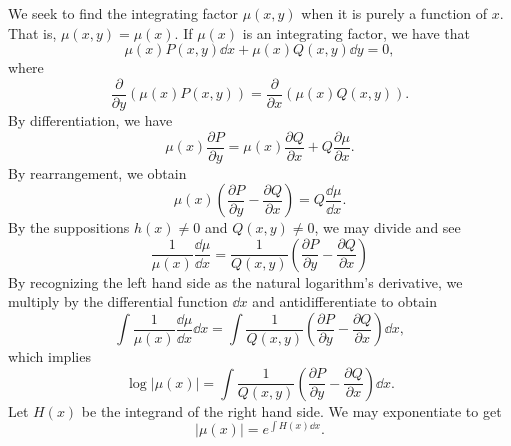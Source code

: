         \vphantom
        \\
        \\
        We seek to find the integrating factor \(\mu(x,y)\) when it is purely a function of \(x\). That is, \(\mu(x,y)=\mu(x)\). If \(\mu(x)\) is an integrating factor, we have that
        \begin{equation*}
            \mu(x)P(x,y)\dd x+\mu(x)Q(x,y)\dd y=0,
        \end{equation*}
        where 
        \begin{equation*}
            \frac{\partial}{\partial y}(\mu(x)P(x,y))=\frac{\partial}{\partial x}(\mu(x)Q(x,y)).
        \end{equation*}
        By differentiation, we have 
        \begin{equation*}
            \mu(x)\frac{\partial P}{\partial y}=\mu(x)\frac{\partial Q}{\partial x}+Q\frac{\partial \mu}{\partial x}.
        \end{equation*}
        By rearrangement, we obtain
        \begin{equation*}
            \mu(x)\left(\frac{\partial P}{\partial y}-\frac{\partial Q}{\partial x}\right)=Q\frac{\dd \mu}{\dd x}.
        \end{equation*}
        By the suppositions \(h(x)\neq0\) and \(Q(x,y)\neq0\), we may divide and see
        \begin{equation*}
            \frac{1}{\mu(x)}\frac{\dd \mu}{\dd x}=\frac{1}{Q(x,y)}\left(\frac{\partial P}{\partial y}-\frac{\partial Q}{\partial x}\right)
        \end{equation*}
        By recognizing the left hand side as the natural logarithm's derivative, we multiply by the differential function \(\dd x\) and antidifferentiate to obtain
        \begin{equation*}
            \int \frac{1}{\mu(x)}\frac{\dd \mu}{\dd x} \dd x=\int \frac{1}{Q(x,y)}\left(\frac{\partial P}{\partial y}-\frac{\partial Q}{\partial x}\right)\dd x,
        \end{equation*} 
        which implies
        \begin{equation*}
            \log|\mu(x)|=\int \frac{1}{Q(x,y)}\left(\frac{\partial P}{\partial y}-\frac{\partial Q}{\partial x}\right)\dd x.
        \end{equation*}
        Let \(H(x)\) be the integrand of the right hand side. We may exponentiate to get
        \begin{equation*}
            |\mu(x)|=e^{\int H(x)\dd x}.
        \end{equation*}
